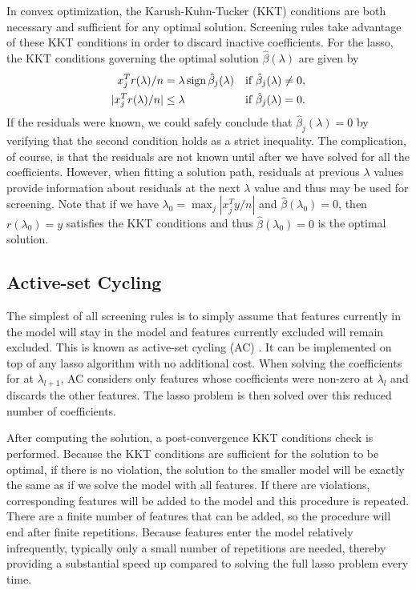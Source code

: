 In convex optimization, the Karush-Kuhn-Tucker (KKT) conditions are both necessary and sufficient for any optimal solution.  Screening rules take advantage of these KKT conditions in order to discard inactive coefficients.  For the lasso, the KKT conditions governing the optimal solution $\hat{\beta}(\lambda)$ are given by
\begin{equation}
  \label{eq:kkt}
  \begin{aligned}
    x_j^Tr(\lambda)/n &= \lambda \, \textrm{sign} \, \hat{\beta}_j(\lambda) & & \textrm{if } \hat{\beta}_j(\lambda)\neq 0,\\
    |x_j^Tr(\lambda)/n| &\leq \lambda & & \textrm{if } \hat{\beta}_j(\lambda)= 0.
  \end{aligned}
\end{equation}
If the residuals were known, we could safely conclude that $\hat{\beta}_j(\lambda)=0$ by verifying that the second condition holds as a strict inequality.  The complication, of course, is that the residuals are not known until after we have solved for all the coefficients.  However, when fitting a solution path, residuals at previous $\lambda$ values provide information about residuals at the next $\lambda$ value and thus may be used for screening. Note that if we have $\lambda_0=\max_j|x_j^Ty/n|$ and $\hat{\beta}(\lambda_0)=0$, then $r(\lambda_0)=y$ satisfies the KKT conditions and thus $\hat{\beta}(\lambda_0)=0$ is the optimal solution.

\subsection{Active-set Cycling}
\label{sec:active}

The simplest of all screening rules is to simply assume that features currently in the model will stay in the model and features currently excluded will remain excluded.  This is known as active-set cycling (AC) \citep{lee2007efficient}. It can be implemented on top of any lasso algorithm with no additional cost. When solving the coefficients for at $\lambda_{l+1}$, AC considers only features whose coefficients were non-zero at $\lambda_l$ and discards the other features. The lasso problem is then solved over this reduced number of coefficients.

After computing the solution, a post-convergence KKT conditions check is performed. Because the KKT conditions are sufficient for the solution to be optimal, if there is no violation, the solution to the smaller model will be exactly the same as if we solve the model with all features. If there are violations, corresponding features will be added to the model and this procedure is repeated. There are a finite number of features that can be added, so the procedure will end after finite repetitions. Because features enter the model relatively infrequently, typically only a small number of repetitions are needed, thereby providing a substantial speed up compared to solving the full lasso problem every time.


